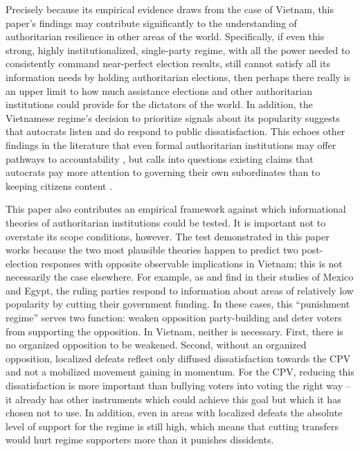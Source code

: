 \documentclass[12pt]{article}
\newcommand{\1}{\mathbbm{1}}
\begin{document}
Precisely because its empirical evidence draws from the case of Vietnam, this paper's findings may contribute significantly to the understanding of authoritarian resilience in other areas of the world. Specifically, if even this strong, highly institutionalized, single-party regime, with all the power needed to consistently command near-perfect election results, still cannot satisfy all its information needs by holding authoritarian elections, then perhaps there really is an upper limit to how much assistance elections and other authoritarian institutions could provide for the dictators of the world. In addition, the Vietnamese regime's decision to prioritize signals about its popularity suggests that autocrats listen and do respond to public dissatisfaction. This echoes other findings in the literature that even formal authoritarian institutions may offer pathways to accountability \citep[e.g.][]{Miller2015}, but calls into questions existing claims that autocrats pay more attention to governing their own subordinates than to keeping citizens content \citep[e.g.][]{Svolik2012}.

This paper also contributes an empirical framework against which informational theories of authoritarian institutions could be tested. It is important not to overstate its scope conditions, however. The test demonstrated in this paper works because the two most plausible theories happen to predict two post-election responses with opposite observable implications in Vietnam; this is not necessarily the case elsewhere.  For example, as \citet{Magaloni2006} and \citet{Blaydes2010} find in their studies of Mexico and Egypt, the ruling parties respond to information about areas of relatively low popularity by cutting their government funding. In these cases, this ``punishment regime'' serves two function: weaken opposition party-building and deter voters from supporting the opposition. In Vietnam, neither is necessary. First, there is no organized opposition to be weakened. Second, without an organized opposition, localized defeats reflect only diffused dissatisfaction towards the CPV and not a mobilized movement gaining in momentum. For the CPV, reducing this dissatisfaction is more important than bullying voters into voting the right way -- it already has other instruments which could achieve this goal but which it has chosen not to use. In addition, even in areas with localized defeats the absolute level of support for the regime is still high, which means that cutting transfers would hurt regime supporters more than it punishes dissidents. 
\end{document}
